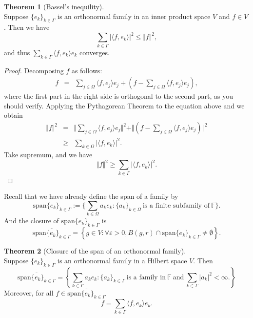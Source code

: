 \documentclass[12pt]{book}
\theoremstyle{definition}
\newtheorem{theorem}{Theorem}[chapter]
\newcommand{\inner}[2]{{\langle #1,#2\rangle}}
\newcommand{\F}{\mathbb{F}}
\begin{document}
\begin{theorem}[Bassel's inequility] \ \\
Suppose $\{e_k\}_{k \in \Gamma}$ is an orthonormal family in an inner product space $V$ and $f \in V$. Then we have
$$
\sum_{k\in \Gamma}|\inner{f}{e_k}|^2 \leq \Vert f \Vert^2,
$$
and thus $ \sum_{k \in \Gamma} \inner{f}{e_k}e_k$ converges.
\end{theorem}
\begin{proof}
Decomposing $f$ as follows:
\begin{eqnarray*}
	f &=& \sum_{j \in \Omega}\inner{f}{e_j}e_j + (f-\sum_{j \in \Omega}\inner{f}{e_j}e_j),
\end{eqnarray*}
where  the first part in the right side is orthogonal to the second part, as you should verify.
Applying the Pythagorean Theorem to the equation above and we obtain
\begin{eqnarray*}
\Vert f\Vert^2 &=& \Vert\sum_{j \in \Omega}\inner{f}{e_j}e_j \Vert^2 + \Vert(f-\sum_{j \in \Omega}\inner{f}{e_j}e_j) \Vert^2 \\
&\geq& \sum_{k \in \Omega}|\inner{f}{e_k}|^2.
\end{eqnarray*}
Take supremum, and we have
$$
\Vert f \Vert ^2 \geq \sum_{k \in \Gamma}|\inner{f}{e_k}|^2.
$$
\end{proof}
Recall that we have already define the span of a family by
$$
\mathrm{span}\{e_k\}_{k \in \Gamma} := \{\sum_{k \in \Omega}a_ke_k: \{a_k\}_{k \in \Omega} \ \text{is a finite subfamily of} \ \F\}.
$$
And the closure of $\mathrm{span}\{e_k\}_{k \in \Gamma}$ is 
$$
\overline{\mathrm{span}\{e_k\}_{k \in \Gamma}}=\left\{ g \in V: \forall \varepsilon>0, B(g,r)\cap \mathrm{span}\{e_k\}_{k \in \Gamma} \neq \emptyset \right\}.
$$
\begin{theorem}[Closure of the span of an orthonormal family] \ \\
Suppose $\{e_k\}_{k \in \Gamma}$ is an orthonormal family in a Hilbert space $V$. Then 
$$
\overline{\mathrm{span}\{e_k\}_{k \in \Gamma}} = \left\{ \sum_{k \in \Gamma}a_ke_k: \{a_k\}_{k \in \Gamma} \ \text{is a family in} \ \F \ \text{and}\ \sum_{k \in \Gamma}|a_k|^2 < \infty. \right\}
$$
Moreover, for all $f \in \overline{\mathrm{span}\{e_k\}_{k \in \Gamma}} $
$$
f = \sum_{k \in \Gamma} \inner{f}{e_k}e_k.
$$	
\end{theorem}
\end{document}
